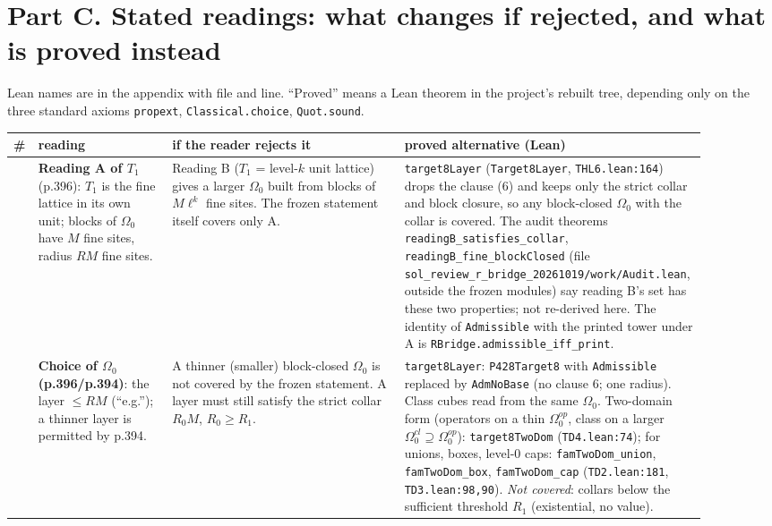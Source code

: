\documentclass[10pt,a4paper]{article}
\begin{document}
\section*{Part C. Stated readings: what changes if rejected, and what is proved instead}
Lean names are in the appendix with file and line. ``Proved'' means a Lean theorem in the project's rebuilt tree, depending only on the three standard axioms \texttt{propext}, \texttt{Classical.choice}, \texttt{Quot.sound}.

\begin{longtable}{@{}>{\raggedright\arraybackslash}p{0.03\linewidth}>{\raggedright\arraybackslash}p{0.19\linewidth}>{\raggedright\arraybackslash}p{0.33\linewidth}>{\raggedright\arraybackslash}p{0.35\linewidth}@{}}
\toprule
\# & reading & if the reader rejects it & proved alternative (Lean) \\\midrule\endhead
1 & \textbf{Reading A of $T_1$} (p.396): $T_1$ is the fine lattice in its own unit; blocks of $\Omega_0$ have $M$ fine sites, radius $RM$ fine sites. & Reading B ($T_1$ = level-$k$ unit lattice) gives a larger $\Omega_0$ built from blocks of $M\ell^k$ fine sites. The frozen statement itself covers only A. & \texttt{target8Layer} (\texttt{Target8Layer}, \texttt{THL6.lean:164}) drops the clause (6) and keeps only the strict collar and block closure, so any block-closed $\Omega_0$ with the collar is covered. The audit theorems \texttt{readingB\_satisfies\_collar}, \texttt{readingB\_fine\_blockClosed} (file \texttt{sol\_review\_r\_bridge\_20261019/work/Audit.lean}, outside the frozen modules) say reading B's set has these two properties; not re-derived here. The identity of \texttt{Admissible} with the printed tower under A is \texttt{RBridge.admissible\_iff\_print}. \\
2 & \textbf{Choice of $\Omega_0$ (p.396/p.394)}: the layer $\le RM$ (``e.g.''); a thinner layer is permitted by p.394. & A thinner (smaller) block-closed $\Omega_0$ is not covered by the frozen statement. A layer must still satisfy the strict collar $R_0M$, $R_0\ge R_1$. & \texttt{target8Layer}: \texttt{P428Target8} with \texttt{Admissible} replaced by \texttt{AdmNoBase} (no clause 6; one radius). Class cubes read from the same $\Omega_0$. Two-domain form (operators on a thin $\Omega_0^{op}$, class on a larger $\Omega_0^{cl}\supseteq\Omega_0^{op}$): \texttt{target8TwoDom} (\texttt{TD4.lean:74}); for unions, boxes, level-0 caps: \texttt{famTwoDom\_union}, \texttt{famTwoDom\_box}, \texttt{famTwoDom\_cap} (\texttt{TD2.lean:181}, \texttt{TD3.lean:98,90}). \emph{Not covered}: collars below the sufficient threshold $R_1$ (existential, no value). \\

\end{longtable}
\end{document}

